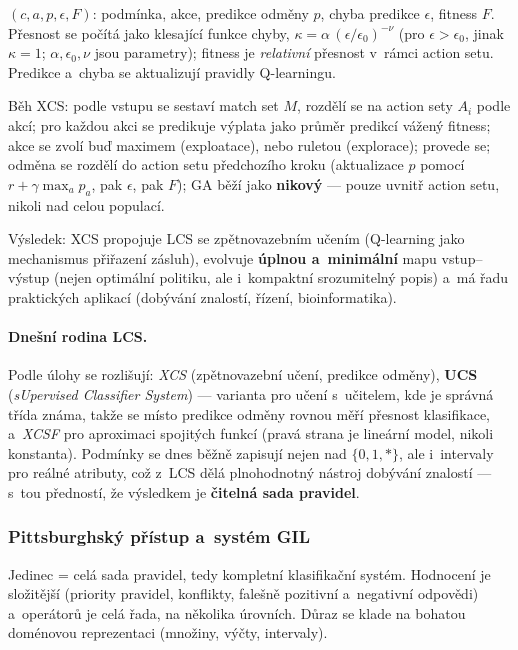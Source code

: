 \documentclass[11pt,a4paper]{article}
\theoremstyle{definition}
\begin{document}
\begin{defbox}
$(c, a, p, \epsilon, F)$: podmínka, akce, predikce odměny $p$, chyba predikce
$\epsilon$, fitness $F$. Přesnost se počítá jako klesající funkce chyby,
$\kappa = \alpha\,(\epsilon/\epsilon_0)^{-\nu}$ (pro $\epsilon > \epsilon_0$,
jinak $\kappa = 1$; $\alpha, \epsilon_0, \nu$ jsou parametry);
fitness je \emph{relativní} přesnost v~rámci action setu.
Predikce a~chyba se aktualizují pravidly Q-learningu.
\end{defbox}

Běh XCS: podle vstupu se sestaví match set $M$, rozdělí se na action sety
$A_i$ podle akcí; pro každou akci se predikuje výplata jako průměr predikcí
vážený fitness; akce se zvolí buď maximem (exploatace), nebo ruletou
(explorace); provede se; odměna se rozdělí do action setu předchozího kroku
(aktualizace $p$ pomocí $r + \gamma \max_a p_a$, pak $\epsilon$, pak $F$);
GA běží jako \textbf{nikový} --- pouze uvnitř action setu, nikoli nad celou
populací.

Výsledek: XCS propojuje LCS se zpětnovazebním učením (Q-learning jako
mechanismus přiřazení zásluh), evolvuje \textbf{úplnou a~minimální} mapu
vstup--výstup (nejen optimální politiku, ale i~kompaktní srozumitelný popis)
a~má řadu praktických aplikací (dobývání znalostí, řízení, bioinformatika).

\paragraph{Dnešní rodina LCS.} Podle úlohy se rozlišují:
\emph{XCS} (zpětnovazební učení, predikce odměny),
\textbf{UCS} (\emph{sUpervised Classifier System}) --- varianta pro učení
s~učitelem, kde je správná třída známa, takže se místo predikce odměny
rovnou měří přesnost klasifikace,
a~\emph{XCSF} pro aproximaci spojitých funkcí (pravá strana je lineární model,
nikoli konstanta). Podmínky se dnes běžně zapisují nejen nad
$\{0,1,*\}$, ale i~intervaly pro reálné atributy, což z~LCS dělá plnohodnotný
nástroj dobývání znalostí --- s~tou předností, že výsledkem je
\textbf{čitelná sada pravidel}.

\subsubsection{Pittsburghský přístup a~systém GIL}

Jedinec = celá sada pravidel, tedy kompletní klasifikační systém. Hodnocení je
složitější (priority pravidel, konflikty, falešně pozitivní a~negativní
odpovědi) a~operátorů je celá řada, na několika úrovních. Důraz se klade na
bohatou doménovou reprezentaci (množiny, výčty, intervaly).
\end{document}
